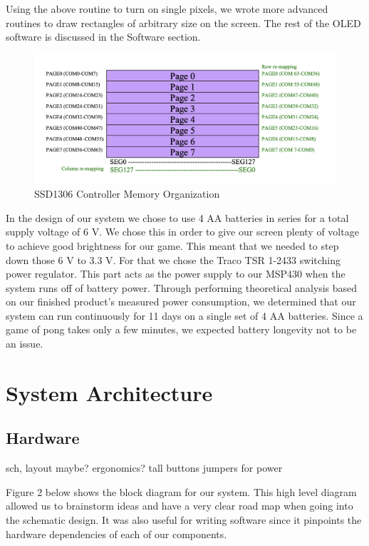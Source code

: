 \documentclass{article}
\begin{document}
Using the above routine to turn on single pixels, we wrote more advanced routines to draw rectangles of arbitrary size on the screen. The rest of the OLED software is discussed in the Software section.

\begin{figure}[h!]
    \centering
    \includegraphics[width=\textwidth]{buffre.png}
    \caption{SSD1306 Controller Memory Organization}
    \label{fig:my_label}
\end{figure}

 In the design of our system we chose to use 4 AA batteries in series for a total supply voltage of 6 V. We chose this in order to give our screen plenty of voltage to achieve good brightness for our game. This meant that we needed to step down those 6 V to 3.3 V. For that we chose the Traco TSR 1-2433 switching power regulator. This part acts as the power supply to our MSP430 when the system runs off of battery power. Through performing theoretical analysis based on our finished product's measured power consumption, we determined that our system can run continuously for 11 days on a single set of 4 AA batteries. Since a game of pong takes only a few minutes, we expected battery longevity not to be an issue.


\section{System Architecture}
\subsection{Hardware}

sch, layout maybe? ergonomics? tall buttons
jumpers for power

Figure 2 below shows the block diagram for our system. This high level diagram allowed us to brainstorm ideas and have a very clear road map when going into the schematic design. It was also useful for writing software since it pinpoints the hardware dependencies of each of our components.
\end{document}

